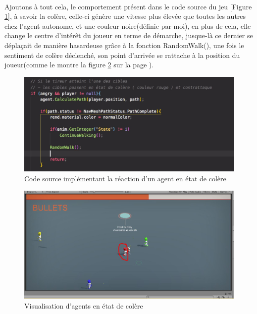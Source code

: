 ~\par
Ajoutons à tout cela, le comportement présent dans le code source du jeu [Figure \ref{fig:derfon}], à savoir la colère, celle-ci génère une vitesse plus élevée que toutes les autres chez l’agent autonome, et une couleur noire(définie par moi), en plus de cela, elle change le centre d'intérêt du joueur en terme de démarche, jusque-là ce dernier se déplaçait de manière hasardeuse grâce à la fonction RandomWalk(), une fois le sentiment de colère déclenché, son point d’arrivée se rattache à la position du joueur(comme le montre la figure \ref{fig:bichi4} sur la page \pageref{fig:bichi4}).



\begin{figure}[th]
\centering
\includegraphics{Figures/derfon.JPG}
\decoRule
\caption[Code source implémentant la réaction d'un agent en état de colère]{Code source implémentant la réaction d'un agent en état de colère}
\label{fig:derfon}
\end{figure}



\begin{figure}[th]
\centering
\includegraphics{Figures/rouge.JPG}
\decoRule
\caption[Visualisation d'agents en état de colère]{Visualisation d'agents en état de colère}
\label{fig:bichi4}
\end{figure}

